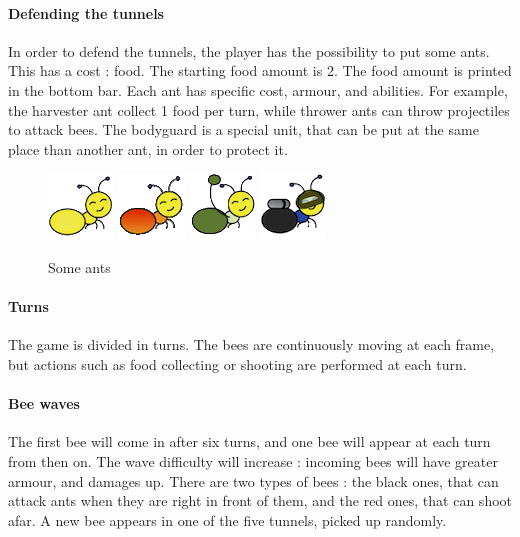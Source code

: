\documentclass[a4paper]{article}
\begin{document}
\paragraph{Defending the tunnels} In order to defend the tunnels, the player has the possibility to put some ants. This has a cost : food. The starting food amount is 2. The food amount is printed in the bottom bar. Each ant has specific cost, armour, and abilities. For example, the harvester ant collect 1 food per turn, while thrower ants can throw projectiles to attack bees. The bodyguard is a special unit, that can be put at the same place than another ant, in order to protect it.

\begin{figure}[H]
	\center
	\includegraphics[scale=0.5]{ant_harvester.png}
	\includegraphics[scale=0.5]{ant_fire.png}
	\includegraphics[scale=0.5]{ant_longthrower.png}
	\includegraphics[scale=0.5]{ant_scuba.png}
	\caption{Some ants}
	\label{someants}
\end{figure}

\paragraph{Turns} The game is divided in turns. The bees are continuously moving at each frame, but actions such as food collecting or shooting are performed at each turn.

\paragraph{Bee waves} The first bee will come in after six turns, and one bee will appear at each turn from then on. The wave difficulty will increase : incoming bees will have greater armour, and damages up. There are two types of bees : the black ones, that can attack ants when they are right in front of them, and the red ones, that can shoot afar. A new bee appears in one of the five tunnels, picked up randomly.
\end{document}
